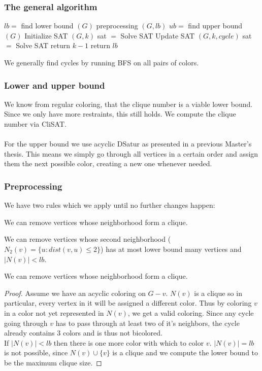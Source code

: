 \documentclass{beamer}
\begin{document}
	\begin{frame}
		\frametitle{The general algorithm}
		\begin{algorithm}[H]
			\caption{General approach for Graph $G$} 
			\begin{algorithmic}[1]
				\State $lb =$ find lower bound $(G)$
				\State preprocessing $(G, lb)$
				\State $ub=$ find upper bound $(G)$
				\State Initialize SAT $(G,k)$
				\State sat $=$ Solve SAT
				\State Update SAT $(G,k,cycle)$
				\State sat $=$ Solve SAT
				\EndWhile
				\State return $k-1$
				\EndIf
				\EndFor
				\State return $lb$
			\end{algorithmic} 
		\end{algorithm}	
		We generally find cycles by running BFS on all pairs of colors.
	\end{frame}
	\begin{frame}
		\frametitle{Lower and upper bound}
		We know from regular coloring, that the clique number is a viable lower bound. Since we only have more restraints, this still holds. We compute the clique number via CliSAT.\\~\\
		For the upper bound we use acyclic DSatur as presented in a previous Master's thesis. This means we simply go through all vertices in a certain order and assign them the next possible color, creating a new one whenever needed.
	\end{frame}
	\begin{frame}
		\frametitle{Preprocessing}
		We have two rules which we apply until no further changes happen:
		\begin{lemma}
			We can remove vertices whose neighborhood form a clique.
		\end{lemma}
		\begin{lemma}
			We can remove vertices whose second neighborhood ($N_2(v)=\{u: dist(v,u)\leq 2\}$) has at most lower bound many vertices and $|N(v)|<lb$.
		\end{lemma}
	\end{frame}
	\begin{frame}
		\begin{lemma}
			We can remove vertices whose neighborhood form a clique.
		\end{lemma}
		\begin{proof}
			Assume we have an acyclic coloring on $G-v$.
			$N(v)$ is a clique so in particular, every vertex in it will be assigned a different color. Thus by coloring $v$ in a color not yet represented in $N(v)$, we get a valid coloring. Since any cycle going through $v$ has to pass through at least two of it's neighbors, the cycle already contains 3 colors and is thus not bicolored.\\
			If $|N(v)|<lb$ then there is one more color with which to color $v$. $|N(v)|=lb$ is not possible, since $N(v)\cup\{v\}$ is a clique and we compute the lower bound to be the maximum clique size.
		\end{proof}
	\end{frame}
\end{document}
